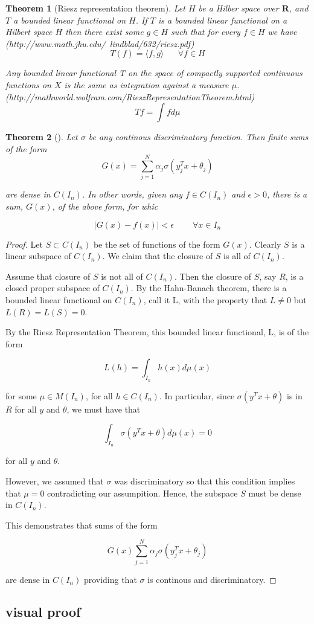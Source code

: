 \documentclass[]{article}
\newtheorem{theorem}{Theorem}[section]
\theoremstyle{definition}
\begin{document}
\begin{theorem}[Riesz representation theorem]
	Let $H$ be a Hilber space over $\mathbf{R}$, and $T$ a bounded linear functional on $H$. If $T$ is a bounded linear functional on a Hilbert space $H$ then there exist some $g \in H$ such that for every $f \in H$ we have (http://www.math.jhu.edu/~lindblad/632/riesz.pdf)
	$$
	T(f) = \langle f,g \rangle \;\;\;\;\;\; \forall f \in H
	$$
	
	Any bounded linear functional T on the space of compactly supported continuous functions on $X$ is the same as integration against a measure $\mu$. (http://mathworld.wolfram.com/RieszRepresentationTheorem.html)
	$$
	Tf = \int f d\mu
	$$
	
\end{theorem}

\begin{theorem}[]
	Let $\sigma$ be any continous discriminatory function. Then finite sums of the form
$$
G\left(x\right) = \sum_{j=1}^{N} \alpha_j \sigma\left(y_j^Tx + \theta_j\right)
$$

are dense in $C(I_n)$. In other words, given any $f \in C(I_n)$ and $\epsilon >0$, there is a sum, $G(x)$, of the above form, for whic

$$
|G(x) - f(x)| < \epsilon \;\;\;\;\;\;\;\; \forall x \in I_n
$$
\end{theorem}

\begin{proof}
Let $S \subset C(I_n)$ be the set of functions of the form $G(x)$. Clearly $S$ is a linear subspace of $C(I_n)$. We claim that the closure of $S$ is all of $C(I_n)$. 

Assume that closure of $S$ is not all of $C(I_n)$. Then the closure of $S$, say $R$, is a closed proper subspace of $C(I_n)$. By the Hahn-Banach theorem, there is a bounded linear functional on $C(I_n)$, call it L, with the property that $L \neq 0$ but $L(R) = L(S) = 0$.

By the Riesz Representation Theorem, this bounded linear functional, L, is of the form 

$$
L(h) = \int_{I_n} h(x)d\mu(x)
$$

for some $\mu \in M(I_n)$, for all $h \in C(I_n)$. In particular, since $\sigma(y^Tx + \theta)$ is in $R$ for all $y$ and $\theta$, we must have that

$$
\int_{I_n} \sigma \left(y^Tx + \theta \right) d\mu(x) = 0
$$

for all $y$ and $\theta$.

However, we assumed that $\sigma$ was discriminatory so that this condition implies that $\mu = 0$ contradicting our assumpition. Hence, the subspace $S$ must be dense in $C(I_n)$.

This demonstrates that sums of the form

$$
G(x) \sum_{j=1}^{N} \alpha_j \sigma\left(y_j^Tx + \theta_j\right)
$$

are dense in $C(I_n)$ providing that $\sigma$ is continous and discriminatory.

\end{proof}


\subsection{visual proof}
\end{document}
